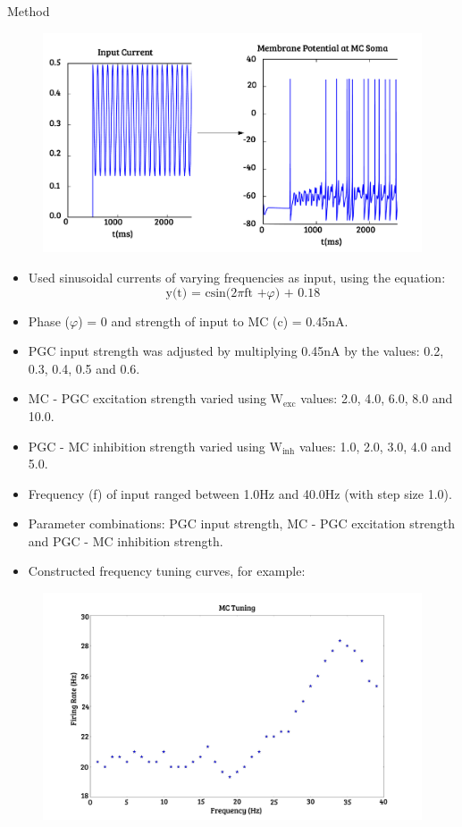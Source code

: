 \documentclass[final,hyperref={pdfpagelabels=false}]{beamer}
\begin{document}
\begin{frame}{}
\begin{columns}[t]
\begin{column}{.48\linewidth}
\begin{block}{Method} 
\begin{figure}
\center
\includegraphics[scale=1]{images/Figure2}
\end{figure}
\begin{itemize}
\item Used sinusoidal currents of varying frequencies as input, using the equation:
\[
\text{y(t) = csin(2} \pi \text{ft +} \varphi\text{) + 0.18}
\]
\item Phase ($\varphi$) = 0 and strength of input to MC (c) = 0.45nA.
\item PGC input strength was adjusted by multiplying 0.45nA by the values: 0.2, 0.3, 0.4, 0.5 and 0.6.
\item MC - PGC excitation strength varied using \mbox{$\text{W}_{\text{exc}}$} values: 2.0, 4.0, 6.0, 8.0 and 10.0.
\item PGC - MC inhibition strength varied using  \mbox{$\text{W}_{\text{inh}}$} values: 1.0, 2.0, 3.0, 4.0 and 5.0.
\item Frequency (f) of input ranged between 1.0Hz and 40.0Hz (with step size 1.0).
\item Parameter combinations: PGC input strength, MC - PGC excitation strength and PGC - MC inhibition strength.
\item Constructed frequency tuning curves, for example:
\end{itemize}
\begin{figure}
\center
\includegraphics[scale=0.5]{images/Figure3}
\end{figure}
\end{block}


\end{column}
\end{columns}
\end{frame}
\end{document}
